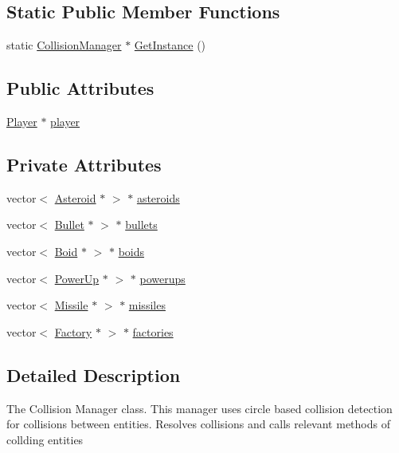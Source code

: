 \subsection*{Static Public Member Functions}
\begin{DoxyCompactItemize}
\item 
static \hyperlink{class_collision_manager}{Collision\+Manager} $\ast$ \hyperlink{class_collision_manager_abe639306dbd7b68510f99d8dc663f3a0}{Get\+Instance} ()
\end{DoxyCompactItemize}
\subsection*{Public Attributes}
\begin{DoxyCompactItemize}
\item 
\hyperlink{class_player}{Player} $\ast$ \hyperlink{class_collision_manager_aaa92cb687e2b743571212e2e3c9f86bf}{player}
\end{DoxyCompactItemize}
\subsection*{Private Attributes}
\begin{DoxyCompactItemize}
\item 
vector$<$ \hyperlink{class_asteroid}{Asteroid} $\ast$ $>$ $\ast$ \hyperlink{class_collision_manager_aef5cf9ee9391bf3329907b812e05bd2d}{asteroids}
\item 
vector$<$ \hyperlink{class_bullet}{Bullet} $\ast$ $>$ $\ast$ \hyperlink{class_collision_manager_a4a41bb9794197a0eb75aed6e8f936e14}{bullets}
\item 
vector$<$ \hyperlink{class_boid}{Boid} $\ast$ $>$ $\ast$ \hyperlink{class_collision_manager_aab48fcf9176eaa95c8562740b3617a58}{boids}
\item 
vector$<$ \hyperlink{class_power_up}{Power\+Up} $\ast$ $>$ $\ast$ \hyperlink{class_collision_manager_a0e37f140934d53f752e758faddcea315}{powerups}
\item 
vector$<$ \hyperlink{class_missile}{Missile} $\ast$ $>$ $\ast$ \hyperlink{class_collision_manager_a9d14346744bea49c6b45534dc7bf74fc}{missiles}
\item 
vector$<$ \hyperlink{class_factory}{Factory} $\ast$ $>$ $\ast$ \hyperlink{class_collision_manager_ad46ec3ec145aeacb4446ad42797964cd}{factories}
\end{DoxyCompactItemize}


\subsection{Detailed Description}
The Collision Manager class. This manager uses circle based collision detection for collisions between entities. Resolves collisions and calls relevant methods of collding entities 

